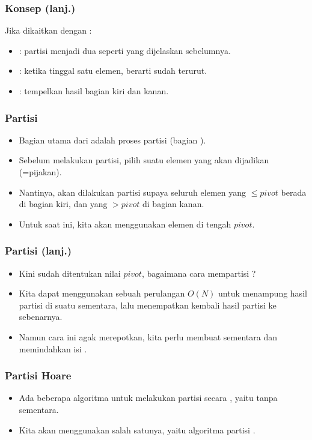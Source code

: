 \begin{frame}
\frametitle{Konsep (lanj.)}
Jika dikaitkan dengan \fdivideAndConquer:
\begin{itemize}
  \item {}: partisi \farray menjadi dua seperti yang dijelaskan sebelumnya.
  \item {}: ketika \farray tinggal satu elemen, berarti sudah terurut.
  \item {}: tempelkan hasil \fquickSort bagian kiri dan kanan.
\end{itemize}
\end{frame}

\begin{frame}
\frametitle{Partisi}
\begin{itemize}
  \item Bagian utama dari \fquickSort adalah proses partisi (bagian ).
  \item Sebelum melakukan partisi, pilih suatu elemen yang akan dijadikan \fpivot (=pijakan).
  \item Nantinya, akan dilakukan partisi supaya seluruh elemen yang $\leq pivot$ berada di bagian kiri, dan yang $> pivot$ di bagian kanan.
  \item Untuk saat ini, kita akan menggunakan elemen di tengah \farray $pivot$.
\end{itemize}
\end{frame}

\begin{frame}
\frametitle{Partisi (lanj.)}
\begin{itemize}
  \item Kini sudah ditentukan nilai $pivot$, bagaimana cara mempartisi \farray?
  \item Kita dapat menggunakan sebuah perulangan $O(N)$ untuk menampung hasil partisi di suatu \farray sementara, lalu menempatkan kembali hasil partisi ke \farray sebenarnya.
  \item Namun cara ini agak merepotkan, kita perlu membuat \farray sementara dan memindahkan isi \farray.
\end{itemize}
\end{frame}

\begin{frame}
\frametitle{Partisi Hoare}
\begin{itemize}
  \item Ada beberapa algoritma untuk melakukan partisi secara , yaitu tanpa \farray sementara.
  \item Kita akan menggunakan salah satunya, yaitu algoritma partisi .
\end{itemize}
\end{frame}

